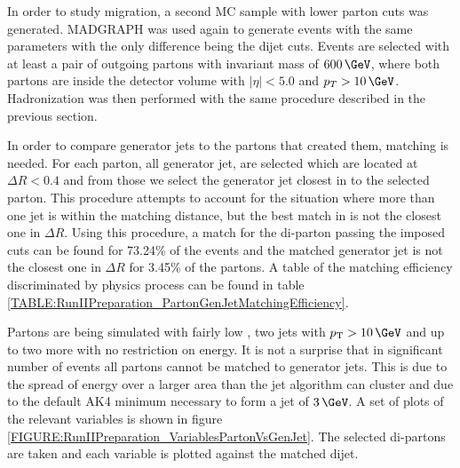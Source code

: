 In order to study migration, a second \gls{MC} sample with lower parton cuts was generated. \textsc{MADGRAPH} was used again to generate events with the same parameters with the only difference being the dijet cuts. Events are selected with at least a pair of outgoing partons with invariant mass of $600\,\GeV$, where both partons are inside the detector volume with $|\eta|<5.0$ and $p_{T}>10\,\GeV$. Hadronization was then performed with the same procedure described in the previous section.

In order to compare generator jets to the partons that created them, matching is needed. For each parton, all generator jet, are selected which are located at $\Delta R < 0.4$ and from those we select the generator jet closest in \pt to the selected parton. This procedure attempts to account for the situation where more than one jet is within the matching distance, but the best match in \pt is not the closest one in $\Delta R$. Using this procedure, a match for the di-parton passing the imposed cuts can be found for 73.24\% of the events and the matched generator jet is not the closest one in $\Delta R$ for 3.45\% of the partons. A table of the matching efficiency discriminated by physics process can be found in table \ref{TABLE:RunIIPreparation_PartonGenJetMatchingEfficiency}. 



Partons are being simulated with fairly low \pt, two jets with $\pt > 10\,\GeV$ and up to two more with no restriction on energy. It is not a surprise that in significant number of events all partons cannot be matched to generator jets. This is due to the spread of energy over a larger area than the jet algorithm can cluster and due to the default AK4 minimum \pt necessary to form a jet of $3\,\GeV$. A set of plots of the relevant variables is shown in figure \ref{FIGURE:RunIIPreparation_VariablesPartonVsGenJet}. The selected di-partons are taken and each variable is plotted against the matched dijet.


